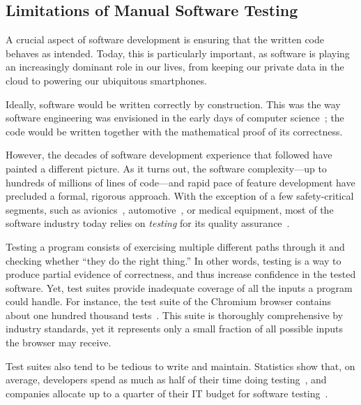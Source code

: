 \subsection{Limitations of Manual Software Testing}

A crucial aspect of software development is ensuring that the written code behaves as intended.  Today, this is particularly important, as software is playing an increasingly dominant role in our lives, from keeping our private data in the cloud to powering our ubiquitous smartphones.

Ideally, software would be written correctly by construction.  This was the way software engineering was envisioned in the early days of computer science~\cite{dijkstra1976discipline}; the code would be written together with the mathematical proof of its correctness.

However, the decades of software development experience that followed have painted a different picture.  As it turns out, the software complexity---up to hundreds of millions of lines of code---and rapid pace of feature development have precluded a formal, rigorous approach.
%
With the exception of a few safety-critical segments, such as avionics~\cite{Astree}, automotive~\cite{automotive}, or medical equipment, most of the software industry today relies on \emph{testing} for its quality assurance~\cite{softwareMetrics}.

Testing a program consists of exercising multiple different paths through it and checking whether ``they do the right thing.''
%
In other words, testing is a way to produce partial evidence of correctness, and thus increase confidence in the tested software.
%
Yet, test suites provide inadequate coverage of all the inputs a program could handle.
%
For instance, the test suite of the Chromium browser contains about one hundred thousand tests~\cite{chrome-tests}.  This suite is thoroughly comprehensive by industry standards, yet it represents only a small fraction of all possible inputs the browser may receive.

%
Test suites also tend to be tedious to write and maintain.  Statistics show that, on average, developers spend as much as half of their time doing testing~\cite{codeComplete}, and companies allocate up to a quarter of their IT budget for software testing~\cite{capgemini-world-quality}.


